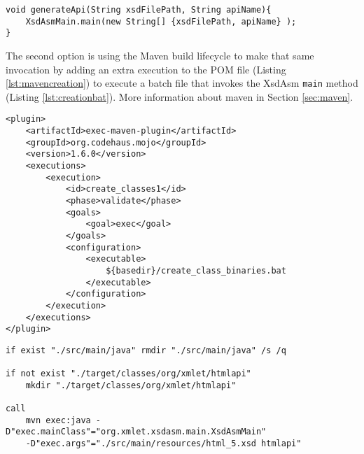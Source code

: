 \begin{minipage}{\linewidth}
\begin{lstlisting}[caption={Fluent Interface Creation},label={lst:directapicreation}]
void generateApi(String xsdFilePath, String apiName){
    XsdAsmMain.main(new String[] {xsdFilePath, apiName} );    
}
\end{lstlisting}
\end{minipage}

\noindent
The second option is using the Maven\cite{maven} build lifecycle\cite{mavenlifecycle} to make that same invocation by adding an extra execution to the \ac{POM} file (Listing \ref{lst:mavencreation}) to execute a batch file that invokes the XsdAsm \texttt{main} method (Listing \ref{lst:creationbat}). More information about maven in Section \ref{sec:maven}.

\bigskip


\begin{minipage}{\linewidth}
\begin{lstlisting}[caption={Maven - Compile Classes using a Plugin},label={lst:mavencreation}]
<plugin>
    <artifactId>exec-maven-plugin</artifactId>
    <groupId>org.codehaus.mojo</groupId>
    <version>1.6.0</version>
    <executions>
        <execution>
            <id>create_classes1</id>
            <phase>validate</phase>
            <goals>
                <goal>exec</goal>
            </goals>
            <configuration>
                <executable>
                    ${basedir}/create_class_binaries.bat
                </executable>
            </configuration>
        </execution>
    </executions>
</plugin>
\end{lstlisting}
\end{minipage}


\begin{minipage}{\linewidth}
\begin{lstlisting}[caption={Maven - The Code that creates the Fluent Interface Classes (create\_class\_binaries.bat)},label={lst:creationbat}]
if exist "./src/main/java" rmdir "./src/main/java" /s /q

if not exist "./target/classes/org/xmlet/htmlapi" 
    mkdir "./target/classes/org/xmlet/htmlapi"

call 
    mvn exec:java -D"exec.mainClass"="org.xmlet.xsdasm.main.XsdAsmMain" 
    -D"exec.args"="./src/main/resources/html_5.xsd htmlapi"
\end{lstlisting}
\end{minipage}


